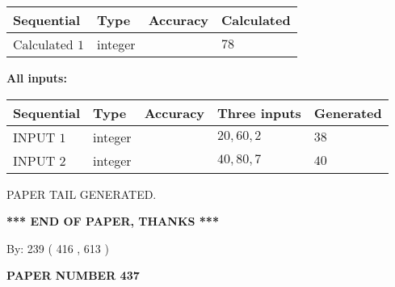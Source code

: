 \documentclass{ctexart}
\begin{document}
   
   
   
\noindent{}
   
   
  
  
\noindent\begin{tabular}{|l|l|l|l|}
\hline
 Sequential & Type & Accuracy & Calculated \\ 
\hline
 
 
  Calculated $  1 $ & integer &  & 
  $ 78 $ 
 \\  \hline  
 \end{tabular}
   
   
   
   
\noindent\vspace{0.1in}\hspace{-0.08in} {\textbf{\Large{All inputs: }}}
   
   
  
  
\noindent\begin{tabular}{|l|l|l|l|l|}
\hline
 Sequential & Type & Accuracy & Three inputs & Generated \\ 
\hline
 
 
  INPUT $  1 $ & integer &  & $
 20
 , 
 60
 , 
 2
 $ & $ 38 $ 
 \\  \hline  
 
 
  INPUT $  2 $ & integer &  & $
 40
 , 
 80
 , 
 7
 $ & $ 40 $ 
 \\  \hline  
 \end{tabular}
   
   
   
   
   
   
 \vspace{0.2in}
 
   
   
\vspace{2.0in} PAPER TAIL GENERATED.
   
   
   
   
\vspace{1.0in} 
{\textbf{\large{ *** END OF PAPER, THANKS *** }}} 
   
   
\hspace{1.0in} By: 
 239 ( 416 ,  613 )
   
   
   
   
\newpage 
\setcounter{page}{ 
   437001 } 
   
   
   
   
 {\textbf{ \Large{ PAPER NUMBER  437  }}}
   
\end{document}
